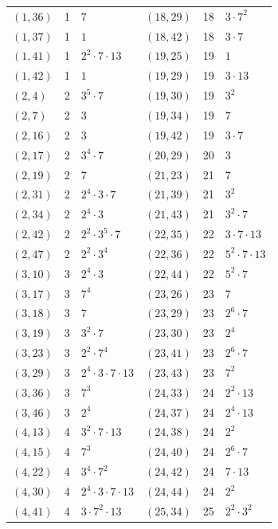 \documentclass[11pt]{article}
\begin{document}
\begin{longtable}{@{}lrl@{\qquad}lrl@{}}
$(1,36)$ & 1 & $7$ & $(18,29)$ & 18 & $3\cdot 7^{2}$\\
$(1,37)$ & 1 & $1$ & $(18,42)$ & 18 & $3\cdot 7$\\
$(1,41)$ & 1 & $2^{2}\cdot 7\cdot 13$ & $(19,25)$ & 19 & $1$\\
$(1,42)$ & 1 & $1$ & $(19,29)$ & 19 & $3\cdot 13$\\
$(2,4)$ & 2 & $3^{5}\cdot 7$ & $(19,30)$ & 19 & $3^{2}$\\
$(2,7)$ & 2 & $3$ & $(19,34)$ & 19 & $7$\\
$(2,16)$ & 2 & $3$ & $(19,42)$ & 19 & $3\cdot 7$\\
$(2,17)$ & 2 & $3^{4}\cdot 7$ & $(20,29)$ & 20 & $3$\\
$(2,19)$ & 2 & $7$ & $(21,23)$ & 21 & $7$\\
$(2,31)$ & 2 & $2^{4}\cdot 3\cdot 7$ & $(21,39)$ & 21 & $3^{2}$\\
$(2,34)$ & 2 & $2^{4}\cdot 3$ & $(21,43)$ & 21 & $3^{2}\cdot 7$\\
$(2,42)$ & 2 & $2^{2}\cdot 3^{5}\cdot 7$ & $(22,35)$ & 22 & $3\cdot 7\cdot 13$\\
$(2,47)$ & 2 & $2^{2}\cdot 3^{4}$ & $(22,36)$ & 22 & $5^{2}\cdot 7\cdot 13$\\
$(3,10)$ & 3 & $2^{4}\cdot 3$ & $(22,44)$ & 22 & $5^{2}\cdot 7$\\
$(3,17)$ & 3 & $7^{4}$ & $(23,26)$ & 23 & $7$\\
$(3,18)$ & 3 & $7$ & $(23,29)$ & 23 & $2^{6}\cdot 7$\\
$(3,19)$ & 3 & $3^{2}\cdot 7$ & $(23,30)$ & 23 & $2^{4}$\\
$(3,23)$ & 3 & $2^{2}\cdot 7^{4}$ & $(23,41)$ & 23 & $2^{6}\cdot 7$\\
$(3,29)$ & 3 & $2^{4}\cdot 3\cdot 7\cdot 13$ & $(23,43)$ & 23 & $7^{2}$\\
$(3,36)$ & 3 & $7^{3}$ & $(24,33)$ & 24 & $2^{2}\cdot 13$\\
$(3,46)$ & 3 & $2^{4}$ & $(24,37)$ & 24 & $2^{4}\cdot 13$\\
$(4,13)$ & 4 & $3^{2}\cdot 7\cdot 13$ & $(24,38)$ & 24 & $2^{2}$\\
$(4,15)$ & 4 & $7^{3}$ & $(24,40)$ & 24 & $2^{6}\cdot 7$\\
$(4,22)$ & 4 & $3^{4}\cdot 7^{2}$ & $(24,42)$ & 24 & $7\cdot 13$\\
$(4,30)$ & 4 & $2^{4}\cdot 3\cdot 7\cdot 13$ & $(24,44)$ & 24 & $2^{2}$\\
$(4,41)$ & 4 & $3\cdot 7^{2}\cdot 13$ & $(25,34)$ & 25 & $2^{2}\cdot 3^{2}$\\

\end{longtable}
\end{document}
